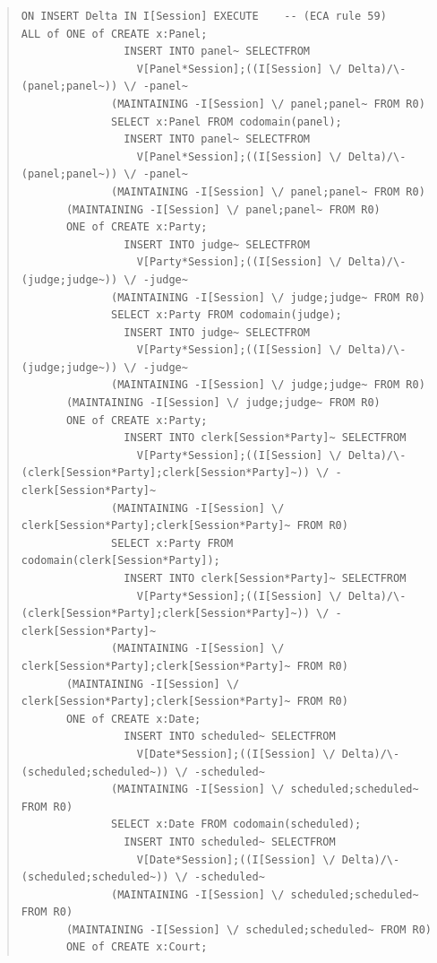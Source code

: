 \documentclass[10pt,a4paper]{report}              %
\theoremstyle{plain}\theorembodyfont{\rmfamily}\newtheorem{definition}{Definition}[section]
\theoremstyle{plain}\theorembodyfont{\rmfamily}\newtheorem{designrule}[definition]{Requirement}
\begin{document}
\begin{quote}
\begin{verbatim}
ON INSERT Delta IN I[Session] EXECUTE    -- (ECA rule 59)
ALL of ONE of CREATE x:Panel;
                INSERT INTO panel~ SELECTFROM
                  V[Panel*Session];((I[Session] \/ Delta)/\-(panel;panel~)) \/ -panel~
              (MAINTAINING -I[Session] \/ panel;panel~ FROM R0)
              SELECT x:Panel FROM codomain(panel);
                INSERT INTO panel~ SELECTFROM
                  V[Panel*Session];((I[Session] \/ Delta)/\-(panel;panel~)) \/ -panel~
              (MAINTAINING -I[Session] \/ panel;panel~ FROM R0)
       (MAINTAINING -I[Session] \/ panel;panel~ FROM R0)
       ONE of CREATE x:Party;
                INSERT INTO judge~ SELECTFROM
                  V[Party*Session];((I[Session] \/ Delta)/\-(judge;judge~)) \/ -judge~
              (MAINTAINING -I[Session] \/ judge;judge~ FROM R0)
              SELECT x:Party FROM codomain(judge);
                INSERT INTO judge~ SELECTFROM
                  V[Party*Session];((I[Session] \/ Delta)/\-(judge;judge~)) \/ -judge~
              (MAINTAINING -I[Session] \/ judge;judge~ FROM R0)
       (MAINTAINING -I[Session] \/ judge;judge~ FROM R0)
       ONE of CREATE x:Party;
                INSERT INTO clerk[Session*Party]~ SELECTFROM
                  V[Party*Session];((I[Session] \/ Delta)/\-(clerk[Session*Party];clerk[Session*Party]~)) \/ -clerk[Session*Party]~
              (MAINTAINING -I[Session] \/ clerk[Session*Party];clerk[Session*Party]~ FROM R0)
              SELECT x:Party FROM codomain(clerk[Session*Party]);
                INSERT INTO clerk[Session*Party]~ SELECTFROM
                  V[Party*Session];((I[Session] \/ Delta)/\-(clerk[Session*Party];clerk[Session*Party]~)) \/ -clerk[Session*Party]~
              (MAINTAINING -I[Session] \/ clerk[Session*Party];clerk[Session*Party]~ FROM R0)
       (MAINTAINING -I[Session] \/ clerk[Session*Party];clerk[Session*Party]~ FROM R0)
       ONE of CREATE x:Date;
                INSERT INTO scheduled~ SELECTFROM
                  V[Date*Session];((I[Session] \/ Delta)/\-(scheduled;scheduled~)) \/ -scheduled~
              (MAINTAINING -I[Session] \/ scheduled;scheduled~ FROM R0)
              SELECT x:Date FROM codomain(scheduled);
                INSERT INTO scheduled~ SELECTFROM
                  V[Date*Session];((I[Session] \/ Delta)/\-(scheduled;scheduled~)) \/ -scheduled~
              (MAINTAINING -I[Session] \/ scheduled;scheduled~ FROM R0)
       (MAINTAINING -I[Session] \/ scheduled;scheduled~ FROM R0)
       ONE of CREATE x:Court;

\end{verbatim}
\end{quote}
\end{document}
